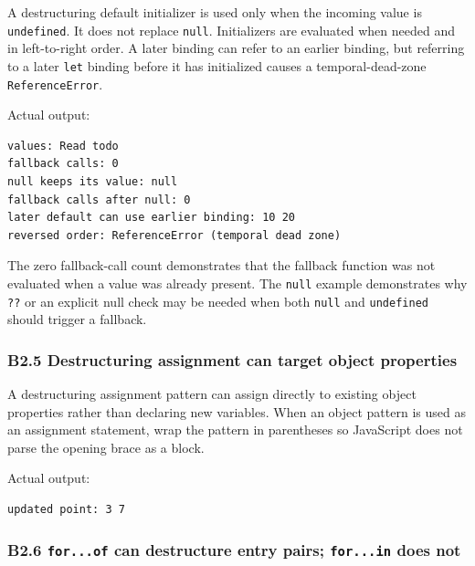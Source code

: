 \documentclass[
]{article}
\newcommand{\passthrough}[1]{#1}
\begin{document}
A destructuring default initializer is used only when the incoming value
is \passthrough{\lstinline!undefined!}. It does not replace
\passthrough{\lstinline!null!}. Initializers are evaluated when needed
and in left-to-right order. A later binding can refer to an earlier
binding, but referring to a later \passthrough{\lstinline!let!} binding
before it has initialized causes a temporal-dead-zone
\passthrough{\lstinline!ReferenceError!}.

Actual output:

\begin{lstlisting}
values: Read todo
fallback calls: 0
null keeps its value: null
fallback calls after null: 0
later default can use earlier binding: 10 20
reversed order: ReferenceError (temporal dead zone)
\end{lstlisting}

The zero fallback-call count demonstrates that the fallback function was
not evaluated when a value was already present. The
\passthrough{\lstinline!null!} example demonstrates why
\passthrough{\lstinline!??!} or an explicit null check may be needed
when both \passthrough{\lstinline!null!} and
\passthrough{\lstinline!undefined!} should trigger a fallback.

\subsubsection{B2.5 Destructuring assignment can target object
properties}\label{b25-destructuring-assignment-can-target-object-properties}

A destructuring assignment pattern can assign directly to existing
object properties rather than declaring new variables. When an object
pattern is used as an assignment statement, wrap the pattern in
parentheses so JavaScript does not parse the opening brace as a block.

Actual output:

\begin{lstlisting}
updated point: 3 7
\end{lstlisting}

\subsubsection{\texorpdfstring{B2.6 \texttt{for...of} can destructure
entry pairs; \texttt{for...in} does
not}{B2.6 for...of can destructure entry pairs; for...in does not}}\label{b26-forof-can-destructure-entry-pairs-forin-does-not}
\end{document}

